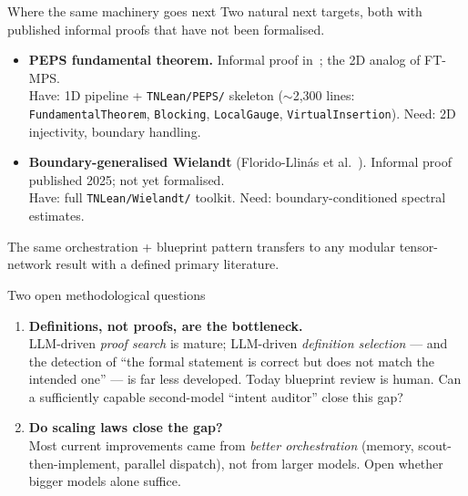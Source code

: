 \documentclass[aspectratio=169,10pt]{beamer}
\begin{document}
\begin{frame}{Where the same machinery goes next}
    Two natural next targets, both with published informal proofs that have not been formalised.
    \vspace{0.4em}
    \begin{itemize}
        \item \textbf{PEPS fundamental theorem.} Informal proof in~\cite{Cirac2021Matrix,Cirac2017Annals,Cirac2017Irreducible}; the 2D analog of FT-MPS.
            \\\textcolor{leangreen}{\footnotesize Have:} 1D pipeline + \texttt{TNLean/PEPS/} skeleton ($\sim$2{,}300 lines: \texttt{FundamentalTheorem}, \texttt{Blocking}, \texttt{LocalGauge}, \texttt{VirtualInsertion}).
            \quad\textcolor{amber}{\footnotesize Need:} 2D injectivity, boundary handling.
        \item \textbf{Boundary-generalised Wielandt} (Florido-Llin\'as et al.~\cite{FloridoLlinas2025Uniform}). Informal proof published 2025; not yet formalised.
            \\\textcolor{leangreen}{\footnotesize Have:} full \texttt{TNLean/Wielandt/} toolkit.
            \quad\textcolor{amber}{\footnotesize Need:} boundary-conditioned spectral estimates.
    \end{itemize}
    \vspace{0.5em}
    \textcolor{dimwhite}{\footnotesize The same orchestration + blueprint pattern transfers to any modular tensor-network result with a defined primary literature.}
\end{frame}

\begin{frame}{Two open methodological questions}
    \begin{enumerate}
        \item \textbf{Definitions, not proofs, are the bottleneck.}\\
            LLM-driven \emph{proof search} is mature; LLM-driven \emph{definition selection} --- and the detection of ``the formal statement is correct but does not match the intended one'' --- is far less developed. Today blueprint review is human. Can a sufficiently capable second-model ``intent auditor'' close this gap?
        \vspace{0.6em}
        \item \textbf{Do scaling laws close the gap?}\\
            Most current improvements came from \emph{better orchestration} (memory, scout-then-implement, parallel dispatch), not from larger models. Open whether bigger models alone suffice.
    \end{enumerate}
\end{frame}
\end{document}
